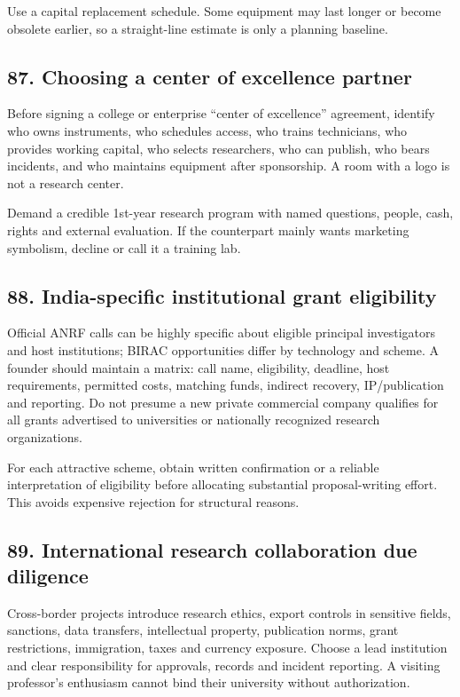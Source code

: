 Use a capital replacement schedule. Some equipment may last longer or become obsolete earlier, so a straight-line estimate is only a planning baseline.

\subsection{87. Choosing a center of excellence partner}

Before signing a college or enterprise ``center of excellence'' agreement, identify who owns instruments, who schedules access, who trains technicians, who provides working capital, who selects researchers, who can publish, who bears incidents, and who maintains equipment after sponsorship. A room with a logo is not a research center.

Demand a credible 1st-year research program with named questions, people, cash, rights and external evaluation. If the counterpart mainly wants marketing symbolism, decline or call it a training lab.

\subsection{88. India-specific institutional grant eligibility}

Official ANRF calls can be highly specific about eligible principal investigators and host institutions; BIRAC opportunities differ by technology and scheme. A founder should maintain a matrix: call name, eligibility, deadline, host requirements, permitted costs, matching funds, indirect recovery, IP/publication and reporting. Do not presume a new private commercial company qualifies for all grants advertised to universities or nationally recognized research organizations.

For each attractive scheme, obtain written confirmation or a reliable interpretation of eligibility before allocating substantial proposal-writing effort. This avoids expensive rejection for structural reasons.

\subsection{89. International research collaboration due diligence}

Cross-border projects introduce research ethics, export controls in sensitive fields, sanctions, data transfers, intellectual property, publication norms, grant restrictions, immigration, taxes and currency exposure. Choose a lead institution and clear responsibility for approvals, records and incident reporting. A visiting professor's enthusiasm cannot bind their university without authorization.

